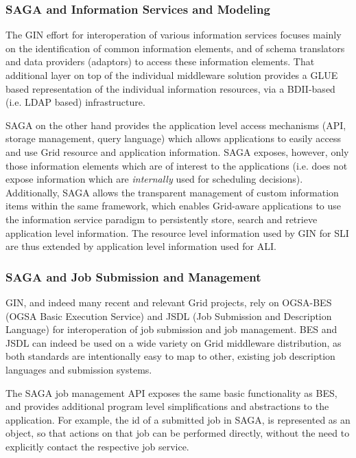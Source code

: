 \documentclass[conference,final]{IEEEtran}
\newcommand{\jhanote}[1]{ {\textcolor{red} { ***Jha: #1 }}}
\begin{document}
\subsubsection{SAGA and Information Services and Modeling}

The GIN effort for interoperation of various information services
focuses mainly on the identification of common information elements,
and of schema translators and data providers (adaptors) to access
these information elements.  That additional layer on top of the
individual middleware solution provides a GLUE based representation of
the individual information resources, via a BDII-based (i.e. LDAP
based) infrastructure.

SAGA on the other hand provides the application level access
mechanisms (API, storage management, query language) which allows
applications to easily access and use Grid resource and application
information.  SAGA exposes, however, only those information elements
which are of interest to the applications (i.e. does not expose
information which are \textit{internally} used for scheduling
decisions).  Additionally, SAGA allows the transparent management of
custom information items within the same framework, which enables
Grid-aware  applications to use the information service paradigm to
persistently store, search and retrieve application level information.
The resource level information used by GIN for SLI are thus extended
by application level information used for ALI.

\subsubsection{SAGA and Job Submission and Management}


GIN, and indeed many recent and relevant Grid projects, rely on
OGSA-BES (OGSA Basic Execution Service) and JSDL (Job Submission and
Description Language) for interoperation of job submission and job
management.  BES and JSDL can indeed be used on a wide variety on Grid
middleware distribution, as both standards are intentionally easy to
map to other, existing job description languages and submission
systems.

The SAGA job management API exposes the same basic functionality as
BES, and provides additional program level simplifications and
abstractions to the application.  For example, the id of a submitted
job in SAGA, is represented as an object, so that actions on that job
can be performed directly, without the need to explicitly contact the
respective job service.
\end{document}
